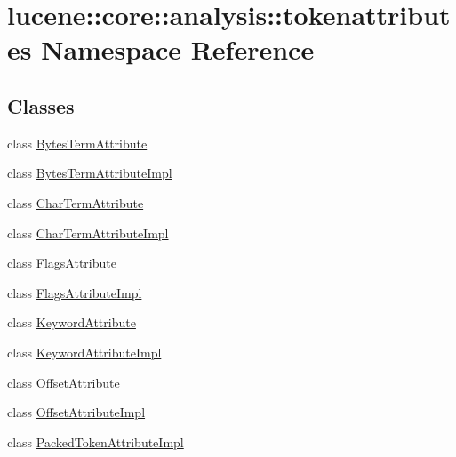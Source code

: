 \hypertarget{namespacelucene_1_1core_1_1analysis_1_1tokenattributes}{}\section{lucene\+:\+:core\+:\+:analysis\+:\+:tokenattributes Namespace Reference}
\label{namespacelucene_1_1core_1_1analysis_1_1tokenattributes}
\subsection*{Classes}
\begin{DoxyCompactItemize}
\item 
class \mbox{\hyperlink{classlucene_1_1core_1_1analysis_1_1tokenattributes_1_1BytesTermAttribute}{Bytes\+Term\+Attribute}}
\item 
class \mbox{\hyperlink{classlucene_1_1core_1_1analysis_1_1tokenattributes_1_1BytesTermAttributeImpl}{Bytes\+Term\+Attribute\+Impl}}
\item 
class \mbox{\hyperlink{classlucene_1_1core_1_1analysis_1_1tokenattributes_1_1CharTermAttribute}{Char\+Term\+Attribute}}
\item 
class \mbox{\hyperlink{classlucene_1_1core_1_1analysis_1_1tokenattributes_1_1CharTermAttributeImpl}{Char\+Term\+Attribute\+Impl}}
\item 
class \mbox{\hyperlink{classlucene_1_1core_1_1analysis_1_1tokenattributes_1_1FlagsAttribute}{Flags\+Attribute}}
\item 
class \mbox{\hyperlink{classlucene_1_1core_1_1analysis_1_1tokenattributes_1_1FlagsAttributeImpl}{Flags\+Attribute\+Impl}}
\item 
class \mbox{\hyperlink{classlucene_1_1core_1_1analysis_1_1tokenattributes_1_1KeywordAttribute}{Keyword\+Attribute}}
\item 
class \mbox{\hyperlink{classlucene_1_1core_1_1analysis_1_1tokenattributes_1_1KeywordAttributeImpl}{Keyword\+Attribute\+Impl}}
\item 
class \mbox{\hyperlink{classlucene_1_1core_1_1analysis_1_1tokenattributes_1_1OffsetAttribute}{Offset\+Attribute}}
\item 
class \mbox{\hyperlink{classlucene_1_1core_1_1analysis_1_1tokenattributes_1_1OffsetAttributeImpl}{Offset\+Attribute\+Impl}}
\item 
class \mbox{\hyperlink{classlucene_1_1core_1_1analysis_1_1tokenattributes_1_1PackedTokenAttributeImpl}{Packed\+Token\+Attribute\+Impl}}
\item 

\end{DoxyCompactItemize}

